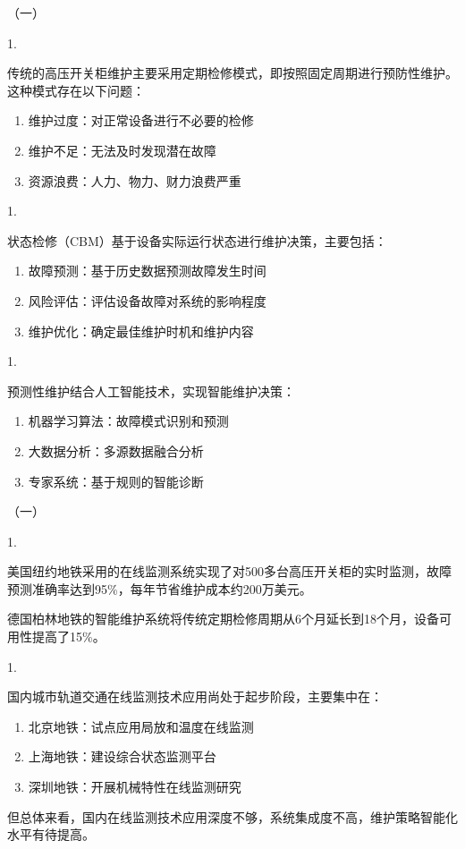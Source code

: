 （一）

1.

传统的高压开关柜维护主要采用定期检修模式，即按照固定周期进行预防性维护。这种模式存在以下问题：
\begin{enumerate}
    \item 维护过度：对正常设备进行不必要的检修
    \item 维护不足：无法及时发现潜在故障
    \item 资源浪费：人力、物力、财力浪费严重
\end{enumerate}

1.

状态检修（CBM）基于设备实际运行状态进行维护决策，主要包括：
\begin{enumerate}
    \item 故障预测：基于历史数据预测故障发生时间
    \item 风险评估：评估设备故障对系统的影响程度
    \item 维护优化：确定最佳维护时机和维护内容
\end{enumerate}

1.

预测性维护结合人工智能技术，实现智能维护决策：
\begin{enumerate}
    \item 机器学习算法：故障模式识别和预测
    \item 大数据分析：多源数据融合分析
    \item 专家系统：基于规则的智能诊断
\end{enumerate}

（一）

1.

美国纽约地铁采用的在线监测系统实现了对500多台高压开关柜的实时监测，故障预测准确率达到95\%，每年节省维护成本约200万美元。

德国柏林地铁的智能维护系统将传统定期检修周期从6个月延长到18个月，设备可用性提高了15\%。

1.

国内城市轨道交通在线监测技术应用尚处于起步阶段，主要集中在：
\begin{enumerate}
    \item 北京地铁：试点应用局放和温度在线监测
    \item 上海地铁：建设综合状态监测平台
    \item 深圳地铁：开展机械特性在线监测研究
\end{enumerate}

但总体来看，国内在线监测技术应用深度不够，系统集成度不高，维护策略智能化水平有待提高。

